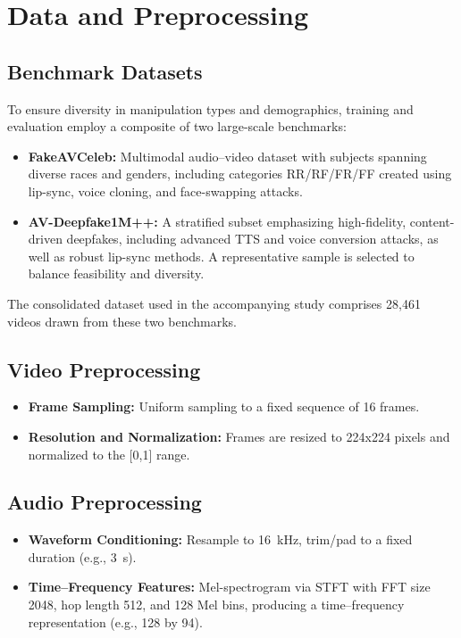 \section{Data and Preprocessing}
\subsection{Benchmark Datasets}
To ensure diversity in manipulation types and demographics, training and evaluation employ a composite of two large-scale benchmarks:
\begin{itemize}
    \item \textbf{FakeAVCeleb:} Multimodal audio–video dataset with subjects spanning diverse races and genders, including categories RR/RF/FR/FF created using lip-sync, voice cloning, and face-swapping attacks. \cite{fakeavceleb2021}
    \item \textbf{AV-Deepfake1M++:} A stratified subset emphasizing high-fidelity, content-driven deepfakes, including advanced TTS and voice conversion attacks, as well as robust lip-sync methods. A representative sample is selected to balance feasibility and diversity.
\end{itemize}
The consolidated dataset used in the accompanying study comprises 28{,}461 videos drawn from these two benchmarks.

\subsection{Video Preprocessing}
\begin{itemize}
    \item \textbf{Frame Sampling:} Uniform sampling to a fixed sequence of 16 frames.
    \item \textbf{Resolution and Normalization:} Frames are resized to 224x224 pixels and normalized to the [0,1] range.
\end{itemize}

\subsection{Audio Preprocessing}
\begin{itemize}
    \item \textbf{Waveform Conditioning:} Resample to 16~kHz, trim/pad to a fixed duration (e.g., 3~s).
    \item \textbf{Time–Frequency Features:} Mel-spectrogram via STFT with FFT size 2048, hop length 512, and 128 Mel bins, producing a time–frequency representation (e.g., 128 by 94). \cite{griffinlim1984}
\end{itemize}

